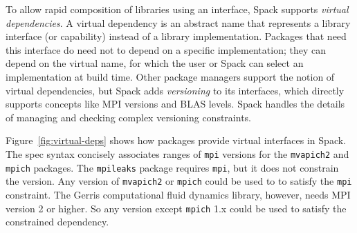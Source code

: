 To allow rapid composition of libraries using an interface, Spack supports
{\it virtual dependencies}.  A virtual dependency is an abstract name that
represents a library interface (or capability) instead of a library
implementation.  Packages that need this interface do need not to depend on
a specific implementation; they can depend on the virtual name, for which
the user or Spack can select an implementation at build time.
Other package managers support the notion of virtual dependencies, but Spack
adds {\it versioning} to its interfaces, which directly supports concepts 
like MPI versions and BLAS levels.  Spack
handles the details of managing and checking complex versioning constraints.

Figure~\ref{fig:virtual-deps} shows how packages provide
virtual interfaces in Spack.  The spec syntax concisely associates ranges 
of {\tt mpi} versions for the {\tt mvapich2} and {\tt mpich} packages.
The {\tt mpileaks} package requires {\tt mpi}, but it does not constrain the version.
Any version of {\tt mvapich2} or {\tt mpich} could be used to to satisfy the {\tt mpi}
constraint. The Gerris computational fluid dynamics library, however, needs MPI version 2 or higher.  So any
version except {\tt mpich} 1.x could be used to satisfy the constrained dependency.


